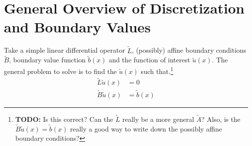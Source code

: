 \documentclass[11pt]{article}
\begin{document}
	\section{General Overview of Discretization and Boundary Values}\label{sec:general}
	Take a simple linear differential operator $\tilde{L}$, (possibly) affine boundary conditions $\tilde{B}$, boundary value function $\tilde{b}(x)$ and the function of interest $\tilde{u}(x)$.  The general problem to solve is to find the $\tilde{u}(x)$ such that.\footnote{\textbf{TODO:} Is this correct? Can the $\tilde{L}$ really be a more general $\tilde{A}$?  Also, is the $\tilde{B}\tilde{u}(x) = \tilde{b}(x)$ really a good way to write down the possibly affine boundary conditions?}
	\begin{align}
		\tilde{L} \tilde{u}(x) &= 0\label{eq:L-u-DE}\\
		\tilde{B} \tilde{u}(x) &= \tilde{b}(x)\label{eq:B-u-DE}
	\end{align}
\end{document}
